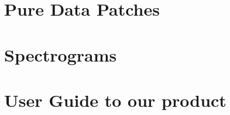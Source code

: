 \chapter{Pure Data Patches}\label{ap:pd_patches}

\chapter{Spectrograms}\label{ap:spectrograms}

\chapter{User Guide to our product}\label{ap:guide}

